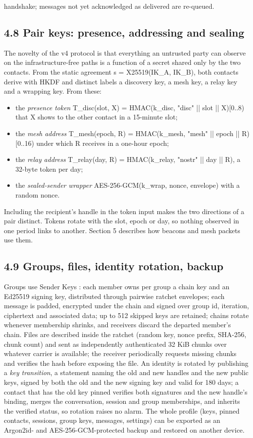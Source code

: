 \documentclass[conference]{IEEEtran}
\begin{document}
handshake; messages not yet acknowledged as delivered are re-queued.

\subsection{4.8 Pair keys: presence, addressing and sealing}
The novelty of the v4 protocol is that everything an untrusted party can observe on the infrastructure-free paths is a function of a secret shared only by the two contacts. From the static agreement s = X25519(IK\_A, IK\_B), both contacts derive with HKDF and distinct labels a discovery key, a mesh key, a relay key and a wrapping key. From these:

\begin{itemize}
  \item the \emph{presence token} T\_disc(slot, X) = HMAC(k\_disc, "disc" || slot || X)[0..8) that X shows to the other contact in a 15-minute slot;
  \item the \emph{mesh address} T\_mesh(epoch, R) = HMAC(k\_mesh, "mesh" || epoch || R)[0..16) under which R receives in a one-hour epoch;
  \item the \emph{relay address} T\_relay(day, R) = HMAC(k\_relay, "nostr" || day || R), a 32-byte token per day;
  \item the \emph{sealed-sender wrapper} AES-256-GCM(k\_wrap, nonce, envelope) with a random nonce.
\end{itemize}
Including the recipient's handle in the token input makes the two directions of a pair distinct. Tokens rotate with the slot, epoch or day, so nothing observed in one period links to another. Section 5 describes how beacons and mesh packets use them.

\subsection{4.9 Groups, files, identity rotation, backup}
Groups use Sender Keys \cite{ref13}: each member owns per group a chain key and an Ed25519 signing key, distributed through pairwise ratchet envelopes; each message is padded, encrypted under the chain and signed over group id, iteration, ciphertext and associated data; up to 512 skipped keys are retained; chains rotate whenever membership shrinks, and receivers discard the departed member's chain. Files are described inside the ratchet (random key, nonce prefix, SHA-256, chunk count) and sent as independently authenticated 32 KiB chunks over whatever carrier is available; the receiver periodically requests missing chunks and verifies the hash before exposing the file. An identity is rotated by publishing a \emph{key transition}, a statement naming the old and new handles and the new public keys, signed by both the old and the new signing key and valid for 180 days; a contact that has the old key pinned verifies both signatures and the new handle's binding, merges the conversation, session and group memberships, and inherits the verified status, so rotation raises no alarm. The whole profile (keys, pinned contacts, sessions, group keys, messages, settings) can be exported as an Argon2id- and AES-256-GCM-protected backup and restored on another device.
\end{document}
